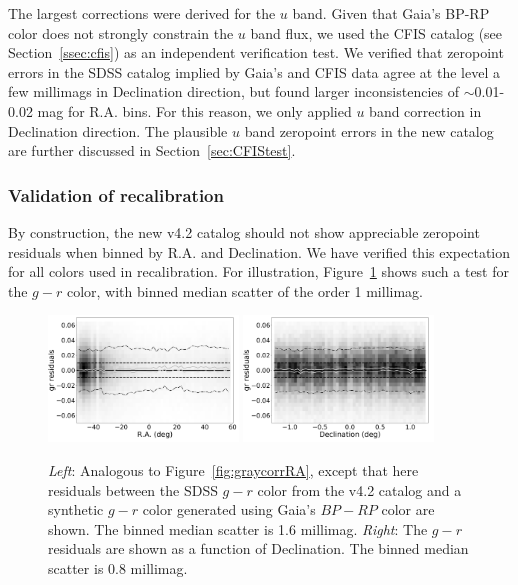 \documentclass[fleqn,usenatbib]{mnras}
\begin{document}
The largest corrections were derived for the $u$ band. Given that Gaia's BP-RP
color does not strongly constrain the $u$ band flux, we used the CFIS catalog 
(see Section~\ref{ssec:cfis}) as an independent verification test. We verified that
zeropoint errors in the SDSS catalog implied by Gaia's and CFIS data agree at the
level a few millimags in Declination direction, but found larger inconsistencies of $\sim$0.01-0.02 mag
 for R.A. bins. For this reason, we only applied $u$ band 
correction in Declination direction. The plausible $u$ band zeropoint errors in 
the new catalog are further discussed in Section~\ref{sec:CFIStest}. %




\subsubsection{Validation of recalibration  \label{sec:SSCvsGaia}} 
  
By construction, the new v4.2 catalog should not show appreciable zeropoint residuals when 
binned by R.A. and Declination. We have verified this expectation for all colors used in 
recalibration. For illustration, Figure~\ref{fig:grVSgaiaRADec} shows such a test for the $g-r$ 
color, with binned median scatter of the order 1 millimag. 

\begin{figure}
    \centering\includegraphics[width=0.45\textwidth]{figures/colorResidGaiaColors_gr_RA_Hess.png} 
    \centering\includegraphics[width=0.45\textwidth]{figures/colorResidGaiaColors_gr_Dec_Hess.png} 
\caption{{\it Left}: Analogous to Figure~\ref{fig:graycorrRA}, except that here residuals between
the SDSS $g-r$ color from the v4.2 catalog and a synthetic $g-r$ color generated using 
Gaia's $BP-RP$ color are shown. The binned median scatter is 1.6 millimag. {\it Right}: The 
$g-r$ residuals are shown as a function of Declination. The binned median scatter is 
0.8 millimag.}
\label{fig:grVSgaiaRADec}
\end{figure}
 
\end{document}
